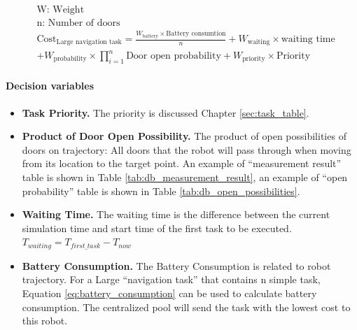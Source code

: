 \begin{equation}
	\label{eq:large_execute_task_cost} 
	\begin{aligned}
	& \mbox{W: Weight } \\
	& \mbox{n: Number of doors} \\
	& \mbox{Cost}_{\mbox{Large navigation task}} = \frac{W_{\mbox{battery}} \times \mbox{Battery consumtion}}{n} + W_{\mbox{waiting}} \times \mbox{waiting time} \\
	& + W_{\mbox{probability}} \times \prod\limits_{i=1}^n \mbox{Door open probability}  + W_{\mbox{priority}} \times \mbox{Priority}
	\end{aligned}
\end{equation}

\paragraph{Decision variables}
\begin{itemize}
\item \textbf{Task Priority.}  The priority is discussed Chapter \ref{sec:task_table}.
\item \textbf{Product of Door Open Possibility.} The product of open possibilities of doors on trajectory: All doors that the robot will pass through when moving from its location to the target point.
	An example of ``measurement result'' table is shown in Table \ref{tab:db_measurement_result}, an example of ``open probability'' table is shown in Table \ref{tab:db_open_possibilities}. 
\item \textbf{Waiting Time. } The waiting time is the difference between the current simulation time and start time of the first task to be executed. $T_{waiting} = T_{first\_task} - T_{now}$
\item \textbf{Battery Consumption.} The Battery Consumption is related to robot trajectory. For a Large ``navigation task'' that contains n simple task, Equation \ref{eq:battery_consumption} can be used to calculate battery consumption. The centralized pool will send the task with the lowest cost to this robot.
\end{itemize}


